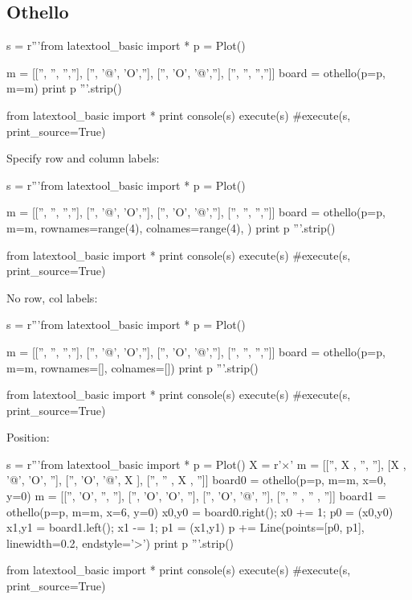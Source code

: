 \subsection{Othello}

\begin{python}
s = r'''from latextool_basic import *
p = Plot()

m = [['', '', '',''],
     ['', '@', 'O',''],
     ['', 'O', '@',''],
     ['', '', '','']]
board = othello(p=p, m=m)
print p
'''.strip()

from latextool_basic import *
print console(s)
execute(s)
#execute(s, print_source=True)
\end{python}


\newpage
Specify row and column labels:

\begin{python}
s = r'''from latextool_basic import *
p = Plot()

m = [['', '', '',''],
     ['', '@', 'O',''],
     ['', 'O', '@',''],
     ['', '', '','']]
board = othello(p=p, m=m,
                rownames=range(4),
                colnames=range(4),
                )
print p
'''.strip()

from latextool_basic import *
print console(s)
execute(s)
#execute(s, print_source=True)
\end{python}


\newpage
No row, col labels:

\begin{python}
s = r'''from latextool_basic import *
p = Plot()

m = [['', '', '',''],
     ['', '@', 'O',''],
     ['', 'O', '@',''],
     ['', '', '','']]
board = othello(p=p, m=m, rownames=[], colnames=[])
print p
'''.strip()

from latextool_basic import *
print console(s)
execute(s)
#execute(s, print_source=True)
\end{python}

\newpage
Position:

\begin{python}
s = r'''from latextool_basic import *
p = Plot()
X = r'$\times$'
m = [['', X  , '',  ''],
     [X , '@', 'O', ''],
     ['', 'O', '@', X ],
     ['', '' , X ,  '']]
board0 = othello(p=p, m=m, x=0, y=0)
m = [['', 'O', '',  ''],
     ['', 'O', 'O', ''],
     ['', 'O', '@', ''],
     ['', '' , '' , '']]
board1 = othello(p=p, m=m, x=6, y=0)
x0,y0 = board0.right(); x0 += 1; p0 = (x0,y0)
x1,y1 = board1.left(); x1 -= 1; p1 = (x1,y1)
p += Line(points=[p0, p1], linewidth=0.2, endstyle='>')
print p
'''.strip()

from latextool_basic import *
print console(s)
execute(s)
#execute(s, print_source=True)
\end{python}





